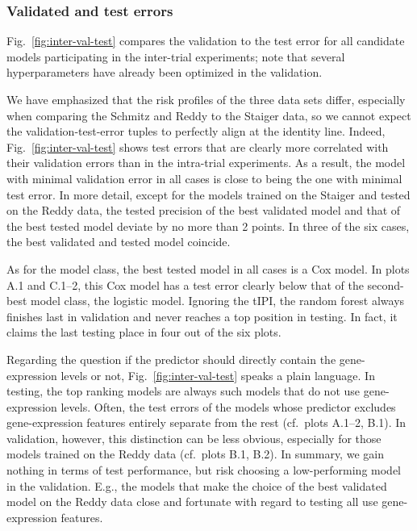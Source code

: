 \subsubsection{Validated and test errors}



Fig.\ \ref{fig:inter-val-test} compares the validation to the test error for all candidate models 
participating in the inter-trial experiments; note that several hyperparameters have already 
been optimized in the validation. 

We have emphasized that the risk profiles of the three data sets differ, especially when comparing 
the Schmitz and Reddy to the Staiger data, so we cannot expect the validation-test-error tuples 
to perfectly align at the identity line. Indeed, Fig.\ 
\ref{fig:inter-val-test} shows test errors that are clearly more correlated with their validation 
errors than in the intra-trial experiments. As a result, the model with minimal validation error in all 
cases is close to being the one with minimal test error. In more detail, except for
the models trained on the Staiger and tested on the Reddy data, the tested precision of the best 
validated model and that of the best tested model deviate by no more than \num{2} points. In 
three of the six cases, the best validated and tested model coincide. 

As for the model class, the best tested model in all cases is a Cox model. In plots A.1 and C.1--2, 
this Cox model has a test error clearly below that of the second-best model class, the 
logistic model. Ignoring the tIPI, the random 
forest always finishes last in validation and never reaches a top position in testing. In fact, 
it claims the last testing place in four out of the six plots.

Regarding the question if the predictor should directly contain the gene-expression levels or not,
Fig.\ \ref{fig:inter-val-test} speaks a plain language. In testing, the top ranking models are 
always such models that do not use gene-expression levels. Often, the test errors of the models whose 
predictor excludes gene-expression features entirely separate from the rest (cf.\ plots A.1--2, B.1). 
In validation, however, this distinction can be less obvious, especially for those models trained on 
the Reddy data (cf.\ plots B.1, B.2). In summary, we gain nothing in terms of test 
performance, but risk choosing a low-performing model in the validation. E.g., the models that 
make the choice of the best validated model on the Reddy data 
close and fortunate with regard to testing all use gene-expression features. 

